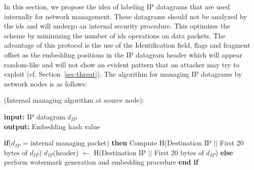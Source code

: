 \documentclass{llncs}
\begin{document}
In this section, we propose the idea of labeling IP datagrams that are used internally for network management. These datagrams should not be analyzed by the \gls*{ids} and will undergo an internal security procedure. This optimizes the scheme by minimizing the number of \gls*{ids} operations on data packets. The advantage of this protocol is the use of the Identification field, flags and fragment offset as the embedding positions in the IP datagram header which will appear random-like and will not show an evident pattern that an attacker may try to exploit (cf. Section~\ref{sec:threat}). The algorithm for managing IP datagrams by network nodes is as follows: \\

\begin{center}
    \begin{algorithm}[!htbp]
    \caption{(Internal managing algorithm at source node):}\label{alg6}
    \hspace*{\algorithmicindent} \textbf{input:}  IP datagram $d_{IP}$ \\
    \hspace*{\algorithmicindent} \textbf{output:}  Embedding hash value
    \begin{algorithmic}[1]
    \State \textbf{if}($d_{IP}$ = internal managing packet) \textbf{then}
    \State \hspace{10pt} Compute H(Destination IP $||$ First 20 bytes of $d_{IP}$)
    \State \hspace{10pt} $d_{IP}$(header) $\gets$ H(Destination IP $||$ First 20 bytes of $d_{IP}$)
    \State \textbf{else} 
    \State \hspace{10pt} perform watermark generation and embedding procedure
    \State \textbf{end if}
    \EndProcedure
    \end{algorithmic}
    \end{algorithm}
\end{center}
\end{document}
